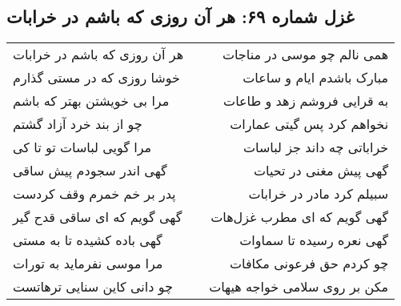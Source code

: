 \begin{center}
\section*{غزل شماره ۶۹: هر آن روزی که باشم در خرابات}
\label{sec:069}
\begin{longtable}{l p{0.5cm} r}
هر آن روزی که باشم در خرابات
&&
همی نالم چو موسی در مناجات
\\
خوشا روزی که در مستی گذارم
&&
مبارک باشدم ایام و ساعات
\\
مرا بی خویشتن بهتر که باشم
&&
به قرایی فروشم زهد و طاعات
\\
چو از بند خرد آزاد گشتم
&&
نخواهم کرد پس گیتی عمارات
\\
مرا گویی لباسات تو تا کی
&&
خراباتی چه داند جز لباسات
\\
گهی اندر سجودم پیش ساقی
&&
گهی پیش مغنی در تحیات
\\
پدر بر خم خمرم وقف کردست
&&
سبیلم کرد مادر در خرابات
\\
گهی گویم که ای ساقی قدح گیر
&&
گهی گویم که ای مطرب غزل‌هات
\\
گهی باده کشیده تا به مستی
&&
گهی نعره رسیده تا سماوات
\\
مرا موسی نفرماید به تورات
&&
چو کردم حق فرعونی مکافات
\\
چو دانی کاین سنایی ترهاتست
&&
مکن بر روی سلامی خواجه هیهات
\\
\end{longtable}
\end{center}
